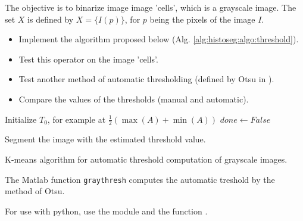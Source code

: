 The objective is to binarize image image 'cells', which is a grayscale image. The set $X$ is defined by $X=\{I(p)\}$, for $p$ being the pixels of the image $I$.
\begin{qbox}
\begin{itemize}
 \item 
Implement the algorithm proposed below (Alg. \ref{alg:histoseg:algo:threshold}).
\item Test this operator on the image 'cells'.
\item Test another method of automatic thresholding (defined by Otsu in \cite{Otsu1979}).
\item Compare the values of the thresholds (manual and automatic).
\end{itemize}
\end{qbox}

\begin{algorithm}[H]
\SetAlgoLined
{}
 Initialize $T_0$, for example at $\frac{1}{2}(\max(A)+\min(A))$\;
	$done\leftarrow False$\;
	
	Segment the image with the estimated threshold value.

\caption{K-means algorithm for automatic threshold computation of grayscale images.}\label{alg:histoseg:algo:threshold}
\end{algorithm}

\vspace*{-4pt}

\begin{mcomment}
\begin{mremark}
The Matlab function \texttt{graythresh} computes the automatic treshold by the method of Otsu. 
\end{mremark}
\end{mcomment}

\begin{pcomment}
\begin{premark}
For use with python, use the module  and the function .
\end{premark}
\end{pcomment}

